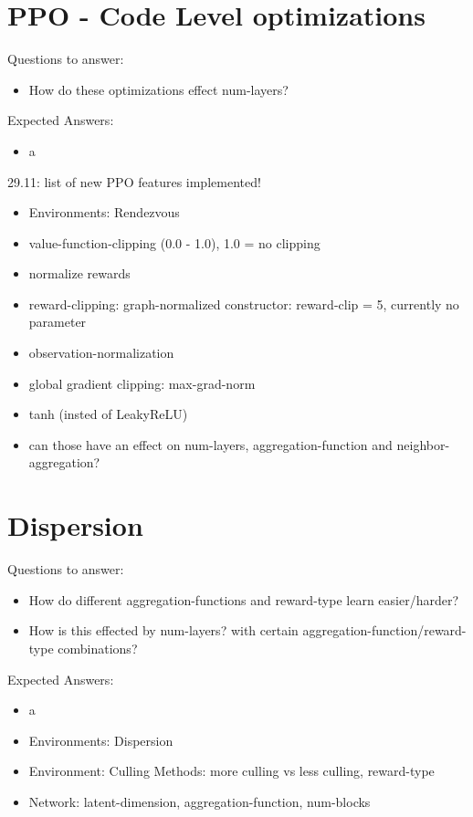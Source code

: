\section{PPO - Code Level optimizations}
Questions to answer:
\begin{itemize}[noitemsep,nolistsep]
    \item How do these optimizations effect num-layers?
\end{itemize}
Expected Answers:
\begin{itemize}[noitemsep,nolistsep]
    \item a
\end{itemize}
29.11: list of new PPO features implemented!
\begin{itemize}[noitemsep,nolistsep]
    \item Environments: Rendezvous
    \item value-function-clipping (0.0 - 1.0), 1.0 = no clipping
    \item normalize rewards
    \item reward-clipping: graph-normalized constructor: reward-clip = 5, currently no parameter
    \item observation-normalization
    \item global gradient clipping: max-grad-norm
    \item tanh (insted of LeakyReLU)
    \item can those have an effect on num-layers, aggregation-function and neighbor-aggregation?
\end{itemize}

\section{Dispersion}
Questions to answer:
\begin{itemize}[noitemsep,nolistsep]
    \item How do different aggregation-functions and reward-type learn easier/harder?
    \item How is this effected by num-layers? with certain aggregation-function/reward-type combinations?
\end{itemize}
Expected Answers:
\begin{itemize}[noitemsep,nolistsep]
    \item a
\end{itemize}
\begin{itemize}[noitemsep,nolistsep]
    \item Environments: Dispersion
    \item Environment: Culling Methods: more culling vs less culling, reward-type
    \item Network: latent-dimension, aggregation-function, num-blocks
\end{itemize}